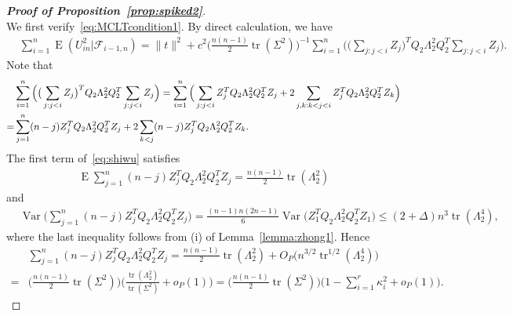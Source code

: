 \documentclass[3p]{elsarticle}
\DeclareMathOperator{\mytr}{tr}
\DeclareMathOperator{\myE}{E}
\DeclareMathOperator{\myVar}{Var}
\theoremstyle{plain}
\theoremstyle{definition}
\theoremstyle{remark}
\begin{document}
\begin{proof}[\textbf{Proof of Proposition~\ref{prop:spiked2}}]
\begin{equation}
     \end{equation}
    We first verify~\eqref{eq:MCLTcondition1}. By direct calculation, we have
     $$
     \begin{aligned}
         &\sum_{i=1}^n \myE(U_{in}^2 |\mathcal{F}_{i-1,n})    
     =\|t\|^2+c^2 \big(\frac{n(n-1)}{2} \mytr(\Sigma^2)\big)^{-1}\sum_{i=1}^n \Big(\big(\sum_{j:j<i} Z_{j}\big)^T Q_2 \Lambda_2^2 Q_2^T \sum_{j:j<i} Z_{j}\Big).
     \end{aligned}
     $$
     Note that
     \begin{align}
         &\sum_{i=1}^n \Big(\big(\sum_{j:j<i} Z_{j}\big)^T Q_2 \Lambda_2^2 Q_2^T \sum_{j:j<i} Z_{j}\Big)
         =
    \sum_{i=1}^n \Big(
         \sum_{j:j<i} Z_{j}^T Q_2 \Lambda_2^2 Q_2^T  Z_{j}
         +
         2\sum_{j,k:k<j<i}Z_{j}^T Q_2 \Lambda_2^2 Q_2^T  Z_{k}
         \Big)
         \notag
         \\
         =&
         \sum_{j=1}^{n} (n-j) Z_{j}^T Q_2 \Lambda_2^2 Q_2^T  Z_{j}
         +
         2\sum_{k<j} (n-j) Z_{j}^T Q_2 \Lambda_2^2 Q_2^T  Z_{k}
         .
         \label{eq:shiwu}
     \end{align}
     The first term of~\eqref{eq:shiwu} satisfies
     $$
     \begin{aligned}
\myE\sum_{j=1}^{n} (n-j) Z_{j}^T Q_2 \Lambda_2^2 Q_2^T  Z_{j}=
         \frac{n(n-1)}{2}\mytr (\Lambda_2^2)
     \end{aligned}
     $$
     and
     $$
     \begin{aligned}
         &\myVar\Big(\sum_{j=1}^{n} (n-j) Z_{j}^T Q_2 \Lambda_2^2 Q_2^T  Z_{j}\Big)=
         \frac{(n-1)n(2n-1)}{6}
         \myVar\big( Z_{1}^T Q_2 \Lambda_2^2 Q_2^T  Z_{1}\big)
         \leq (2+\Delta)
         n^3\mytr(\Lambda_2^4),
     \end{aligned}
     $$
     where the last inequality follows from (i) of Lemma~\ref{lemma:zhong1}.
     Hence
     \begin{equation}\label{eq:shiwu2}
     \begin{aligned}
         &
         {\sum_{j=1}^{n} (n-j) Z_{j}^T Q_2 \Lambda_2^2 Q_2^T  Z_{j}}
         =
         \frac{n(n-1)}{2}\mytr(\Lambda_2^2)+O_{P}\big(n^{3/2} \mytr^{1/2} (\Lambda_2^4)\big)
         \\
         =&
\big(\frac{n(n-1)}{2}\mytr (\Sigma^2)\big)
         \Big(\frac{\mytr (\Lambda_2^2)}{\mytr(\Sigma^2)} +o_P(1)\Big)
         =
\big(\frac{n(n-1)}{2}\mytr (\Sigma^2)\big)
         \Big(1-\sum_{i=1}^r \kappa_i^2 +o_P(1)\Big).
     \end{aligned}

\end{equation}
\end{proof}
\end{document}
